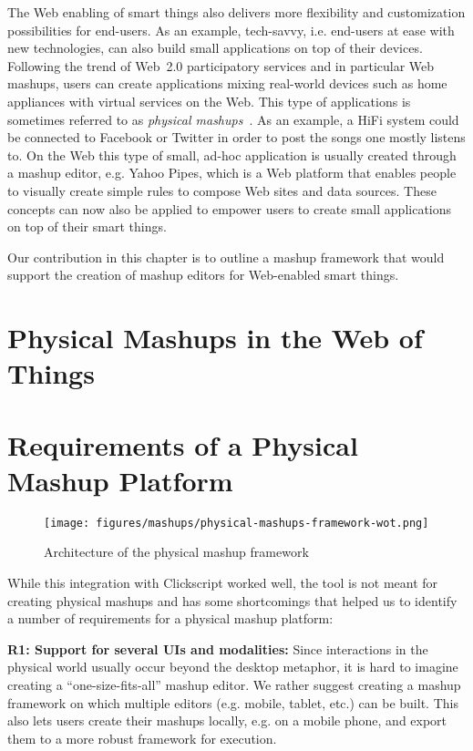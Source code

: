 The Web enabling of smart things also delivers more flexibility and customization possibilities for end-users. As an example, tech-savvy, i.e. end-users at ease with new technologies, can also build small applications on top of their devices. Following the trend of Web~2.0 participatory services and in particular Web mashups, users can create applications mixing real-world devices such as home appliances with virtual services on the Web. This type of applications is sometimes referred to as \textit{physical mashups}~\cite{guinard_architectingmashable_2010}. As an example, a HiFi system could be connected to Facebook or Twitter in order to post the songs one mostly listens to. On the Web this type of small, ad-hoc application is usually created through a mashup editor, e.g. Yahoo Pipes, which is a Web platform that enables people to visually create simple rules to compose Web sites and data sources. These concepts can now also be applied to empower users to create small applications on top of their smart things.

Our contribution in this chapter is to outline a mashup framework that would support the creation of mashup editors for Web-enabled smart things.

\section{Physical Mashups in the Web of Things}


\section{Requirements of a Physical Mashup Platform}
\begin{figure}[t]
\centering
\texttt{[image: figures/mashups/physical-mashups-framework-wot.png]}
\caption{Architecture of the physical mashup framework}
\label{fig:mashupFwork}
\end{figure}
While this integration with Clickscript worked well, the tool is not meant for creating physical mashups and has some shortcomings that helped us to identify a number of requirements for a physical mashup platform:

\textbf{R1: Support for several UIs and modalities:} Since interactions in the physical world usually occur beyond the desktop metaphor, it is hard to imagine creating a ``one-size-fits-all'' mashup editor. We rather suggest creating a mashup framework on which multiple editors (e.g. mobile, tablet, etc.) can be built. This also lets users create their mashups locally, e.g. on a mobile phone, and export them to a more robust framework for execution.

